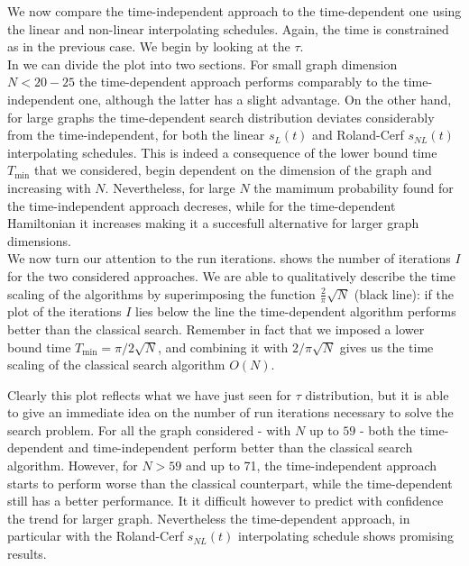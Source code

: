        We now compare the time-independent approach to the time-dependent one using the linear and non-linear interpolating schedules. Again, the time is constrained as in the previous case. We begin by looking at the $\tau$. \\
        In  we can divide the plot  into two sections. For small graph dimension $N<20-25$ the time-dependent approach performs comparably to the time-independent one, although the latter has a slight advantage. On the other hand, for large graphs the time-dependent search distribution deviates considerably from the time-independent, for both the linear $s_L(t)$ and Roland-Cerf $s_{NL}(t)$ interpolating schedules. This is indeed a consequence of the lower bound time $T_{\min}$ that we considered, begin dependent on the dimension of the graph and increasing with $N$. Nevertheless, for large $N$ the mamimum probability found for the time-independent approach decreses, while for the time-dependent Hamiltonian it increases making it a succesfull alternative for larger graph dimensions. \\
        


        We now turn our attention to the run iterations.  shows the number of iterations $I$ for the two considered approaches. We are able to qualitatively describe the time scaling of the algorithms by superimposing the function $\frac{2}{\pi}\sqrt{N}$ (black line): if the plot of the iterations $I$ lies below the line the time-dependent algorithm performs better than the classical search. Remember in fact that we imposed a lower bound time $T_{\min} = \pi /2 \sqrt{N}$, and combining it with $2/ \pi \sqrt{N}$ gives us the time scaling of the classical search algorithm $O(N)$.
        \clearpage
        

        Clearly this plot reflects what we have just seen for $\tau$ distribution, but it is able to give an immediate idea on the number of run iterations necessary to solve the search problem. For all the graph considered - with $N$ up to $59$ - both the time-dependent and time-independent perform better than the classical search algorithm. However, for $N>59$ and up to 71, the time-independent approach starts to perform worse than the classical counterpart, while the time-dependent still has a better performance. It it difficult however to predict with confidence the trend for larger graph. Nevertheless the time-dependent approach, in particular with the Roland-Cerf $s_{NL}(t)$ interpolating schedule shows promising results.

